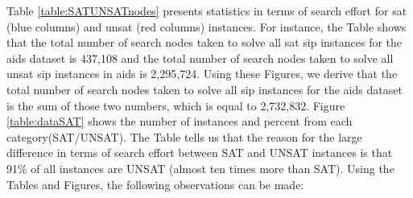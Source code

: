 \documentclass{l4proj}
\begin{document}
Table \ref{table:SATUNSATnodes} presents statistics in terms of search effort for \gls{sat} (blue columns) and \gls{unsat} (red columns) instances. For instance, the Table shows that the total number of search nodes taken to solve all \gls{sat} \gls{sip} instances for the aids dataset is 437,108 and the total number of search nodes taken to solve all \gls{unsat} \gls{sip} instances in aids is 2,295,724. Using these Figures, we derive that the total number of search nodes taken to solve all \gls{sip} instances for the aids dataset is the sum of those two numbers, which is equal to 2,732,832. Figure \ref{table:dataSAT} shows the number of instances and percent from each category(SAT/UNSAT). The Table tells us that the reason for the large difference in terms of search effort between SAT and UNSAT instances is that 91\% of all instances are UNSAT (almost ten times more than SAT). Using the Tables and Figures, the following observations can be made:
\end{document}
